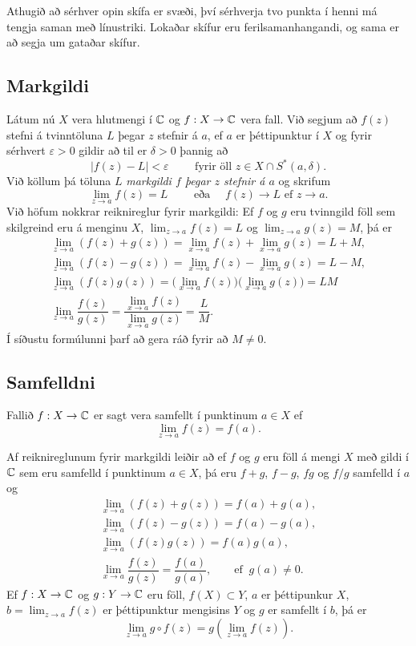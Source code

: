 Athugið að sérhver opin skífa er svæði, því sérhverja tvo punkta í
henni má
tengja saman með línustriki.  Lokaðar skífur eru ferilsamanhangandi,
og sama er að segja um gataðar skífur.


\subsection*{Markgildi}

Látum nú $X$ vera hlutmengi í ${\mathbb C}$ og $f:X\to {\mathbb C}$ vera fall.  Við
segjum að $f(z)$ stefni á tvinntöluna $L$ þegar  $z$ stefnir á $a$, ef $a$ er
þéttipunktur í $X$ og fyrir sérhvert $\varepsilon>0$ gildir að til er
$\delta>0$ þannig að 
$$
|f(z)-L|<\varepsilon \qquad \text{ fyrir öll } z\in X\cap S^\ast(a,\delta).
$$
Við köllum þá töluna $L$ {\it markgildi $f$ þegar $z$ stefnir á $a$}
og skrifum 
$$
\lim_{z\to a}f(z)=L  \qquad \text{ eða } \quad f(z)\to L \text{ ef }
z\to a.
$$
Við höfum nokkrar reiknireglur fyrir markgildi:  Ef $f$ og $g$ eru
tvinngild föll sem skilgreind eru á menginu $X$, $\lim_{z\to a}f(z)=L$
og $\lim_{z\to a}g(z)=M$, þá er 
\begin{gather*}
\lim_{z\to a}(f(z)+g(z))=\lim_{x\to a}f(z)+\lim_{x\to a}g(z)=L+M,\\
\lim_{z\to a}(f(z)-g(z))=\lim_{x\to a}f(z)-\lim_{x\to a}g(z)=L-M,\\
\lim_{z\to a}(f(z)g(z))=\big(\lim_{x\to a}f(z)\big)\big(\lim_{x\to
a}g(z)\big)=LM\\
\lim_{z\to a}\dfrac{f(z)}{g(z)}=\dfrac{\lim_{x\to a}f(z)}{\lim_{x\to
a}g(z)}=\dfrac LM.
\end{gather*}
Í síðustu formúlunni þarf að gera ráð fyrir að $M\neq 0$.


\subsection*{Samfelldni}

Fallið $f:X\to {\mathbb C}$ er sagt vera samfellt í punktinum $a\in X$ ef
$$
\lim_{z\to a}f(z)=f(a).
$$


Af reiknireglunum fyrir markgildi leiðir að ef $f$ og $g$ eru föll
á mengi $X$ með gildi í ${\mathbb C}$ sem eru samfelld í punktinum $a\in X$, þá
eru $f+g$, $f-g$, $fg$ og $f/g$ samfelld í $a$ og 
\begin{gather*}
\lim_{x\to a}(f(z)+g(z))=f(a)+g(a),\\
\lim_{x\to a}(f(z)-g(z))=f(a)-g(a),\\
\lim_{x\to a}(f(z)g(z))=f(a)g(a),\\
\lim_{x\to a}\dfrac{f(z)}{g(z)}=\dfrac{f(a)}{g(a)}, 
\qquad \text{ef } \ g(a)\neq 0.
\end{gather*}
Ef $f:X\to {\mathbb C}$ og $g:Y\to {\mathbb C}$ eru föll,  $f(X)\subset Y$,
$a$ er þéttipunkur $X$, $b=\lim_{z\to a}f(z)$ er
þéttipunktur mengisins $Y$ og $g$ er samfellt í $b$, þá er
$$
\lim_{z\to a} g\circ f(z)=g(\lim_{z\to a}f(z)).
$$


